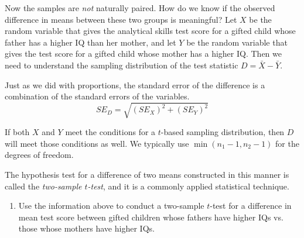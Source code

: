 \documentclass[10pt]{article}\usepackage[]{graphicx}\usepackage[]{color}
\begin{document}
Now the samples are \emph{not} naturally paired. How do we know if the observed difference in means between these two groups is meaningful? Let $X$ be the random variable that gives the analytical skills test score for a gifted child whose father has a higher IQ than her mother, and let $Y$ be the random variable that gives the test score for a gifted child whose mother has a higher IQ. Then we need to understand the sampling distribution of the test statistic $D = \bar{X}- \bar{Y}$.

Just as we did with proportions, the standard error of the difference is a combination of the standard errors of the variables. 
$$
  SE_D  = \sqrt{(SE_X)^2 + (SE_Y)^2}
$$

If both $X$ and $Y$ meet the conditions for a $t$-based sampling distribution, then $D$ will meet those conditions as well. We typically use $\min(n_1-1, n_2-1)$ for the degrees of freedom.

The hypothesis test for a difference of two means constructed in this manner is called the \emph{two-sample $t$-test}, and it is a commonly applied statistical technique. 

\begin{enumerate}
  \itemsep1in
  \item Use the information above to conduct a two-sample $t$-test for a difference in mean test score between gifted children whose fathers have higher IQs vs. those whose mothers have higher IQs.
\end{enumerate}
\vspace{2in}
\end{document}
